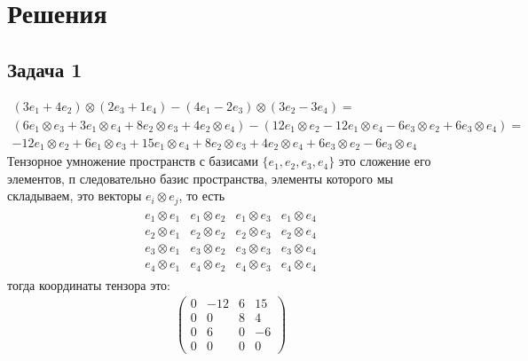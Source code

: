 
\newpage
\section*{Решения}
\subsection*{Задача 1}
\begin{gather*}
	(3e_1 + 4e_2) \otimes (2e_3 + 1e_4) - (4e_1 - 2e_3) \otimes (3e_2 - 3e_4) = \\
	(6 e_1 \otimes e_3 + 3 e_1 \otimes e_4 + 8 e_2 \otimes e_3 + 4 e_2 \otimes e_4) - (12 e_1 \otimes e_2 - 12e_1 \otimes e_4 - 6e_3 \otimes e_2 + 6e_3 \otimes e_4) =\\
	-12e_1 \otimes e_2 + 6e_1 \otimes e_3 + 15e_1 \otimes e_4 + 8e_2 \otimes e_3 + 4e_2 \otimes e_4 + 6e_3 \otimes e_2 - 6e_3 \otimes e_4
\end{gather*}
Тензорное умножение пространств с базисами $\{e_1, e_2, e_3, e_4\}$ это сложение его элементов, п следовательно базис пространства, элементы которого мы складываем, это векторы $e_i \otimes e_j$, то есть
\begin{gather*}
\begin{matrix}
	e_1 \otimes e_1 & e_1 \otimes e_2 & e_1 \otimes e_3 & e_1 \otimes e_4\\
	e_2 \otimes e_1 & e_2 \otimes e_2 & e_2 \otimes e_3 & e_2 \otimes e_4\\
	e_3 \otimes e_1 & e_3 \otimes e_2 & e_3 \otimes e_3 & e_3 \otimes e_4\\
	e_4 \otimes e_1 & e_4 \otimes e_2 & e_4 \otimes e_3 & e_4 \otimes e_4
\end{matrix}
\end{gather*}
тогда координаты тензора это:
\begin{gather*}
\begin{pmatrix}
	0 & -12 & 6 & 15\\
	0 & 0 & 8 & 4\\
	0 & 6 & 0 & -6\\
	0 & 0 & 0 & 0
\end{pmatrix}
\end{gather*}

